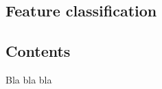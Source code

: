   \begin{titlepage}
    \vspace*{\fill}
      \part{Feature classification}
    \vspace*{\fill}
  \end{titlepage}

\chapter*{Contents}

Bla bla bla
